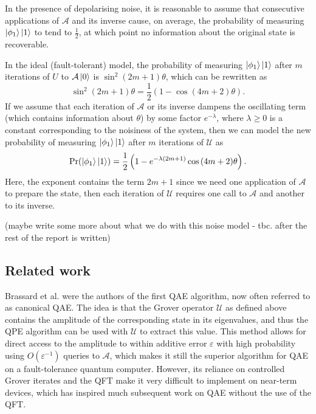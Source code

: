 In the presence of depolarising noise, it is reasonable to assume that consecutive applications of $\mathcal{A}$ and its inverse cause, on average, the probability of measuring $\ket{\phi_1}\ket{1}$ to tend to $\frac{1}{2}$, at which point no information about the original state is recoverable.

In the ideal (fault-tolerant) model, the probability of measuring $\ket{\phi_1} \ket{1}$ after $m$ iterations of $U$ to $\mathcal{A} \ket{0}$ is $\sin^2{(2m+1) \theta }$, which can be rewritten as
\[
\sin^2{(2m+1) \theta } = \frac{1}{2} \left( 1 - \cos{ (4m+2) \theta } \right).
\]
If we assume that each iteration of $\mathcal{A}$ or its inverse dampens the oscillating term (which contains information about $\theta$) by some factor $e^{-\lambda}$, where $\lambda \geq 0$ is a constant corresponding to the noisiness of the system, then we can model the new probability of measuring $\ket{\phi_1}\ket{1}$ after $m$ iterations of $\mathcal{U}$ as
\[
\Pr(\ket{\phi_1} \ket{1}) = \frac{1}{2} \left( 1 - e^{- \lambda (2m+1)} \cos{ (4m+2) \theta } \right).
\]
Here, the exponent contains the term $2m+1$ since we need one application of $\mathcal{A}$ to prepare the state, then each iteration of $\mathcal{U}$ requires one call to $\mathcal{A}$ and another to its inverse.

{\color{purple} (maybe write some more about what we do with this noise model - tbc. after the rest of the report is written)}

\subsection{Related work}

Brassard et al. \cite{Quantum Amplitude Amplification and Estimation} were the authors of the first QAE algorithm, now often referred to as canonical QAE. The idea is that the Grover operator $\mathcal{U}$ as defined above contains the amplitude of the corresponding state in its eigenvalues, and thus the QPE algorithm can be used with $\mathcal{U}$ to extract this value. This method allows for direct access to the amplitude to within additive error $\varepsilon$ with high probability using $O(\varepsilon^{-1})$ queries to $\mathcal{A}$, which makes it still the superior algorithm for QAE on a fault-tolerance quantum computer. However, its reliance on controlled Grover iterates and the QFT make it very difficult to implement on near-term devices, which has inspired much subsequent work on QAE without the use of the QFT.

